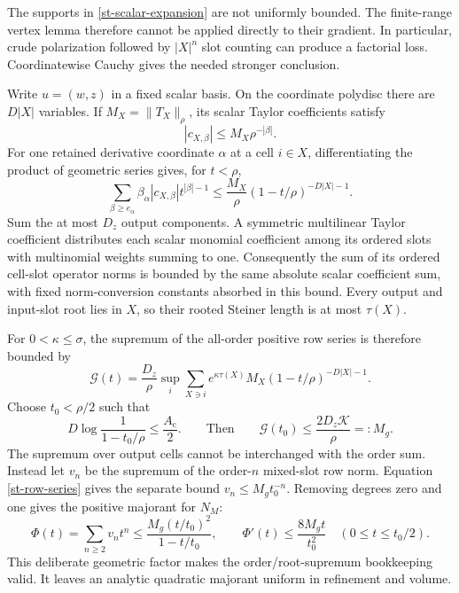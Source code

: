 The supports in \eqref{st-scalar-expansion} are not uniformly bounded.
The finite-range vertex lemma therefore cannot be applied directly to
their gradient. In particular, crude polarization followed by
$|X|^n$ slot counting can produce a factorial loss. Coordinatewise
Cauchy gives the needed stronger conclusion.

Write $u=(w,z)$ in a fixed scalar basis. On the coordinate polydisc
there are $D|X|$ variables. If $M_X=\|T_X\|_\rho$, its scalar Taylor
coefficients satisfy
\begin{equation}
 |c_{X,\beta}|\le M_X\rho^{-|\beta|}.                       \label{st-scalar-cauchy}
\end{equation}
For one retained derivative coordinate $\alpha$ at a cell $i\in X$,
differentiating the product of geometric series gives, for $t<\rho$,
\begin{equation}
 \sum_{\beta\ge e_\alpha}
 \beta_\alpha |c_{X,\beta}|t^{|\beta|-1}
 \le\frac{M_X}{\rho}(1-t/\rho)^{-D|X|-1}.                   \label{st-gradient-cauchy}
\end{equation}
Sum the at most $D_z$ output components. A symmetric multilinear Taylor
coefficient distributes each scalar monomial coefficient among its
ordered slots with multinomial weights summing to one. Consequently
the sum of its ordered cell-slot operator norms is bounded by the same
absolute scalar coefficient sum, with fixed norm-conversion constants
absorbed in this bound. Every output and input-slot root lies in $X$,
so their rooted Steiner length is at most $\tau(X)$.

For $0<\kappa\le\sigma$, the supremum of the all-order positive row
series is therefore bounded by
\begin{equation}
 \mathcal G(t)=\frac{D_z}{\rho}\sup_i\sum_{X\ni i}
 e^{\kappa\tau(X)}M_X(1-t/\rho)^{-D|X|-1}.                  \label{st-row-series}
\end{equation}
Choose $t_0<\rho/2$ such that
\begin{equation}
 D\log\frac1{1-t_0/\rho}\le\frac{A_{\mathrm c}}2.
 \qquad\text{Then}\qquad
 \mathcal G(t_0)\le\frac{2D_z\mathcal K}{\rho}=:M_g.         \label{st-majorant-radius}
\end{equation}
The supremum over output cells cannot be interchanged with the order
sum. Instead let $v_n$ be the supremum of the order-$n$ mixed-slot row
norm. Equation \eqref{st-row-series} gives the separate bound
$v_n\le M_gt_0^{-n}$. Removing degrees zero and one gives the positive
majorant for $N_M$:
\begin{equation}
 \Phi(t)=\sum_{n\ge2}v_nt^n
 \le\frac{M_g(t/t_0)^2}{1-t/t_0},\qquad
 \Phi'(t)\le\frac{8M_gt}{t_0^2}\quad(0\le t\le t_0/2).
                                                               \label{st-nonlinear-majorant}
\end{equation}
This deliberate geometric factor makes the order/root-supremum
bookkeeping valid. It leaves an analytic quadratic majorant uniform in
refinement and volume.

